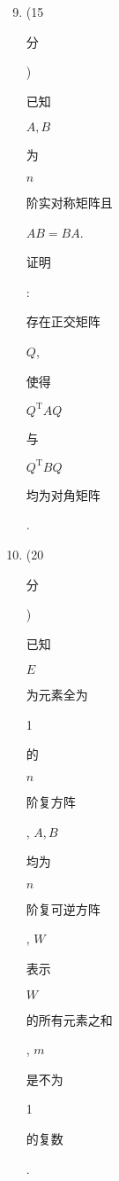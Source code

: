 \documentclass[10pt]{article}
\begin{document}
\begin{enumerate}
  \setcounter{enumi}{8}
  \item (15 \begin{CJK}{UTF8}{mj}分\end{CJK}) \begin{CJK}{UTF8}{mj}已知\end{CJK} $A, B$ \begin{CJK}{UTF8}{mj}为\end{CJK} $n$ \begin{CJK}{UTF8}{mj}阶实对称矩阵且\end{CJK} $A B=B A$. \begin{CJK}{UTF8}{mj}证明\end{CJK}: \begin{CJK}{UTF8}{mj}存在正交矩阵\end{CJK} $Q$, \begin{CJK}{UTF8}{mj}使得\end{CJK} $Q^{\mathrm{T}} A Q$ \begin{CJK}{UTF8}{mj}与\end{CJK} $Q^{\mathrm{T}} B Q$ \begin{CJK}{UTF8}{mj}均为对角矩阵\end{CJK}.

  \item (20 \begin{CJK}{UTF8}{mj}分\end{CJK}) \begin{CJK}{UTF8}{mj}已知\end{CJK} $E$ \begin{CJK}{UTF8}{mj}为元素全为\end{CJK} 1 \begin{CJK}{UTF8}{mj}的\end{CJK} $n$ \begin{CJK}{UTF8}{mj}阶复方阵\end{CJK}, $A, B$ \begin{CJK}{UTF8}{mj}均为\end{CJK} $n$ \begin{CJK}{UTF8}{mj}阶复可逆方阵\end{CJK}, $W$ \begin{CJK}{UTF8}{mj}表示\end{CJK} $W$ \begin{CJK}{UTF8}{mj}的所有元素之和\end{CJK}, $m$ \begin{CJK}{UTF8}{mj}是不为\end{CJK} 1 \begin{CJK}{UTF8}{mj}的复数\end{CJK}.

\end{enumerate}
\end{document}
